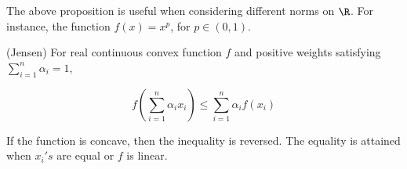 The above proposition is useful when considering different norms on $\R$. For instance, the function
$f(x)=x^p$, for $p\in (0,1)$.  

\begin{prop}
(Jensen) 
For real continuous convex function $f$ and positive weights satisfying $\sum_{i=1}^n \alpha_i=1$,  

\begin{equation*}
    f\left(\sum_{i=1}^n \alpha_i x_i\right) \leq \sum_{i=1}^n \alpha_i f(x_i)
\end{equation*}

If the function is concave, then the inequality is reversed.  
The equality is attained when $x_i's$ are equal or $f$ is linear.
\end{prop}
